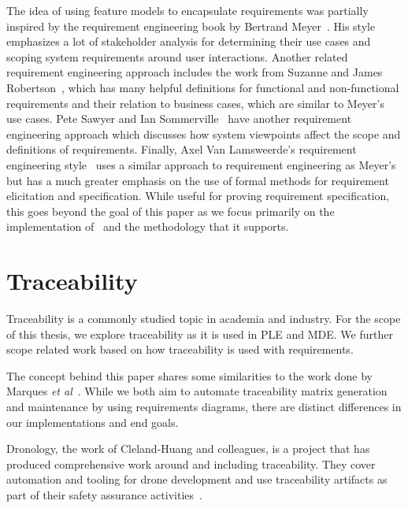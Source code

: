 The idea of using feature models to encapsulate requirements was partially inspired by the requirement engineering book by Bertrand Meyer~\cite{meyer2022handbook}. His style emphasizes a lot of stakeholder analysis for determining their use cases and scoping system requirements around user interactions. Another related requirement engineering approach includes the work from Suzanne and James Robertson~\cite{robertson2012mastering, robertson2000volere}, which has many helpful definitions for functional and non-functional requirements and their relation to business cases, which are similar to Meyer's use cases. Pete Sawyer and Ian Sommerville~\cite{sommerville1997requirements, sommerville1997viewpoints} have another requirement engineering approach which discusses how system viewpoints affect the scope and definitions of requirements. Finally, Axel Van Lamsweerde's requirement engineering style~\cite{lamsweerde2009requirements} uses a similar approach to requirement engineering as Meyer's but has a much greater emphasis on the use of formal methods for requirement elicitation and specification. While useful for proving requirement specification, this goes beyond the goal of this paper as we focus primarily on the implementation of \tool\ and the methodology that it supports.


\section{Traceability}

Traceability is a commonly studied topic in academia and industry. For the scope of this thesis, we explore traceability as it is used in \ac{PLE} and \ac{MDE}. We further scope related work based on how traceability is used with requirements. 

The concept behind this paper shares some similarities to the work done by Marques \textit{\textit{et al}}~\cite{6945504}. While we both aim to automate traceability matrix generation and maintenance by using requirements diagrams, there are distinct differences in our implementations and end goals. 

Dronology, the work of Cleland-Huang and colleagues, is a project that has produced comprehensive work around and including traceability. They cover automation and tooling for drone development and use traceability artifacts as part of their safety assurance activities~\cite{Cleland-HuangBCSR07, AgrawalC23, DBLP:conf/splc/Cleland-HuangAI20, mirakhorli2011tracing}.

